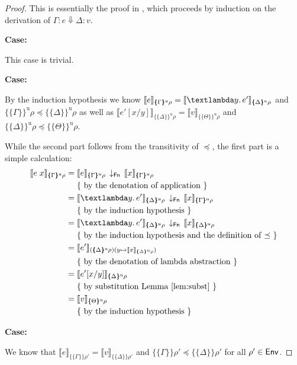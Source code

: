 \documentclass[twopage]{scrartcl}
\theoremstyle{nonumberbreak}
\newtheorem{proof}{Proof}
\newcommand{\sEnv}  {\text{\textsf{Env}}}
\newcommand{\sFnProj}[2]{#1\,\downarrow_{\text{\textsf{Fn}}}\,#2}
\newcommand{\sApp}[2]{#1\;#2}
\newcommand{\sLam}[2]{\text{\textlambda} #1.\, #2}
\newcommand{\sred}[4]{#1 : #2 \Downarrow #3 : #4}
\newcommand{\sRule}[1]{\text{{\textsc{#1}}}}
\newcommand{\dsem}[2]{\llbracket #1 \rrbracket_{#2}}
\newcommand{\esem}[1]{\{\!\!\!\{#1\}\!\!\!\}}
\newcommand{\esemu}[1]{\{\!\!\!\{#1\}\!\!\!\}^{\text{u}}}
\newcommand{\case}[1]{\par\smallskip\noindent\textbf{Case:} #1\nopagebreak\par\noindent\ignorespaces}
\newcommand{\aexpl}[1]{&\mathrel{\phantom{=}}\left\{\text{ #1 }\right\}}
\begin{document}
\begin{proof}
This is essentially the proof in \cite{launchbury}, which proceeds by induction on the derivation of $\sred \Gamma e \Delta v$.

\case{\sRule{Lam}}
This case is trivial.

\case{\sRule{App}}
By the induction hypothesis we know
$\dsem{e}{\esemu{\Gamma}\rho} = \dsem{\sLam y {e'}}{\esemu{\Delta}\rho}$ and $\esemu{\Gamma}\rho \preceq \esemu{\Delta}\rho$ as well as $\dsem{e'[x/y]}{\esemu{\Delta}\rho} = \dsem{v}{\esemu{\Theta}\rho}$ and $\esemu{\Delta}\rho \preceq \esemu{\Theta}\rho$.

While the second part follows from the transitivity of $\preceq$, the first part is a simple calculation:
\begin{align*}
\dsem{\sApp{e}{x}}{\esemu{\Gamma}\rho} &= \sFnProj{\dsem{e}{\esemu{\Gamma}\rho}}{\dsem{x}{\esemu{\Gamma}{\rho}}}\\
\aexpl{by the denotation of application} \\
&= \sFnProj{\dsem{\sLam y {e'}}{\esemu{\Delta}\rho}}{\dsem{x}{\esemu{\Gamma}{\rho}}}\\ 
\aexpl{by the induction hypothesis} \\
&= \sFnProj{\dsem{\sLam y {e'}}{\esemu{\Delta}\rho}}{\dsem{x}{\esemu{\Delta}{\rho}}}\\ 
\aexpl{by the induction hypothesis and the definition of $\preceq$} \\
&= \dsem{e'}{(\esemu{\Delta}\rho)(y \mapsto \dsem{x}{\esemu{\Delta}{\rho}})}\\ 
\aexpl{by the denotation of lambda abstraction} \\
&= \dsem{e'[x/y]}{\esemu{\Delta}\rho}\\ 
\aexpl{by substitution Lemma \ref{lem:subst}} \\
&= \dsem{v}{\esemu{\Theta}\rho}\\
\aexpl{by the induction hypothesis}
\end{align*}

\case{\sRule{Var}}
We know that $\dsem{e}{\esem{\Gamma}\rho'}=\dsem{v}{\esem{\Delta}\rho'}$ and $\esem{\Gamma}\rho' \preceq \esem{\Delta}\rho'$ for all $\rho'\in\sEnv$.


\end{proof}
\end{document}
